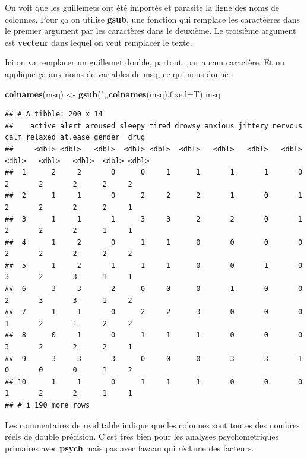 \documentclass[
]{book}
\newenvironment{Shaded}{\begin{snugshade}}{\end{snugshade}}
\newcommand{\AttributeTok}[1]{\textcolor[rgb]{0.13,0.29,0.53}{#1}}
\newcommand{\FunctionTok}[1]{\textcolor[rgb]{0.13,0.29,0.53}{\textbf{#1}}}
\newcommand{\NormalTok}[1]{#1}
\newcommand{\OtherTok}[1]{\textcolor[rgb]{0.56,0.35,0.01}{#1}}
\newcommand{\StringTok}[1]{\textcolor[rgb]{0.31,0.60,0.02}{#1}}
\begin{document}
On voit que les guillemets ont été importés et parasite la ligne des noms de colonnes.
Pour ça on utilise \textbf{gsub}, une fonction qui remplace les caractéères dans le premier
argument par les caractères dans le deuxième. Le troisième argument est \textbf{vecteur}
dans lequel on veut remplacer le texte.

Ici on va remplacer un guillemet double, partout, par aucun caractère. Et on applique
ça aux noms de variables de msq, ce qui nous donne :

\begin{Shaded}
\begin{Highlighting}[]
\FunctionTok{colnames}\NormalTok{(msq) }\OtherTok{\textless{}{-}} \FunctionTok{gsub}\NormalTok{(}\StringTok{\textquotesingle{}"\textquotesingle{}}\NormalTok{,}\StringTok{\textquotesingle{}\textquotesingle{}}\NormalTok{,}\FunctionTok{colnames}\NormalTok{(msq),}\AttributeTok{fixed=}\NormalTok{T)}
\NormalTok{msq}
\end{Highlighting}
\end{Shaded}

\begin{verbatim}
## # A tibble: 200 x 14
##    active alert aroused sleepy tired drowsy anxious jittery nervous  calm relaxed at.ease gender  drug
##     <dbl> <dbl>   <dbl>  <dbl> <dbl>  <dbl>   <dbl>   <dbl>   <dbl> <dbl>   <dbl>   <dbl>  <dbl> <dbl>
##  1      2     2       0      0     1      1       1       1       0     2       2       2      2     2
##  2      1     1       0      2     2      2       1       0       1     2       2       2      2     1
##  3      1     1       1      3     3      2       2       0       1     2       2       2      1     1
##  4      1     2       0      1     1      0       0       0       0     2       2       2      2     2
##  5      1     2       1      1     1      0       0       1       0     3       2       3      1     1
##  6      3     3       2      0     0      0       1       0       0     2       3       3      1     2
##  7      1     1       0      2     2      3       0       0       0     1       2       1      2     2
##  8      0     1       0      1     1      1       0       0       0     3       2       2      2     1
##  9      3     3       3      0     0      0       3       3       1     0       0       0      1     2
## 10      1     1       0      1     1      1       0       0       0     1       2       2      1     1
## # i 190 more rows
\end{verbatim}

Les commentaires de read.table indique que les colonnes sont toutes des nombres
réels de double précision. C'est très bien pour les analyses psychométriques
primaires avec \textbf{psych} mais pas avec lavaan qui réclame des facteurs.
\end{document}
